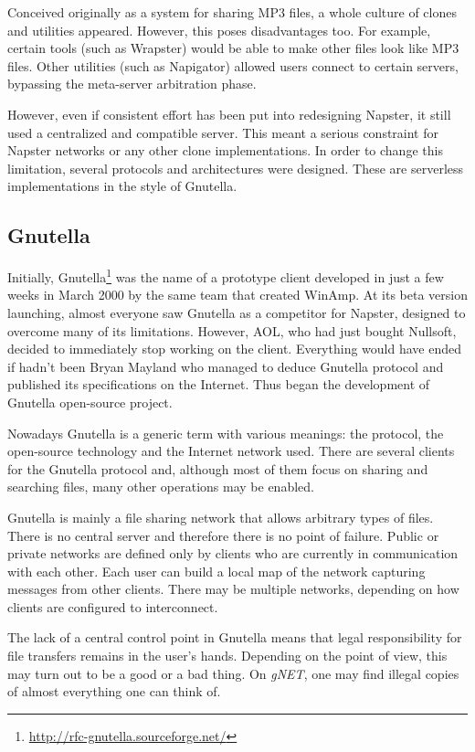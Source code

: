 Conceived originally as a system for sharing MP3 files, a whole culture of
clones and utilities appeared. However, this poses disadvantages too. For
example, certain tools (such as Wrapster) would be able to make other files
look like MP3 files. Other utilities (such as Napigator) allowed users
connect to certain servers, bypassing the meta-server arbitration phase.

However, even if consistent effort has been put into redesigning Napster, it
still used a centralized and compatible server. This meant a serious
constraint for Napster networks or any other clone implementations. In order
to change this limitation, several protocols and architectures were designed.
These are serverless implementations in the style of Gnutella.

\subsection{Gnutella}

Initially, Gnutella\footnote{\url{http://rfc-gnutella.sourceforge.net/}} was the name of a prototype client developed in just a few
weeks in March 2000 by the same team that created WinAmp. At its beta version
launching, almost everyone saw Gnutella as a competitor for Napster, designed
to overcome many of its limitations. However, AOL, who had just bought
Nullsoft, decided to immediately stop working on the client. Everything would
have ended if hadn't been Bryan Mayland who managed to deduce Gnutella
protocol and published its specifications on the Internet. Thus began the
development of Gnutella open-source project.

Nowadays Gnutella is a generic term with various meanings: the protocol, the
open-source technology and the Internet network used. There are several
clients for the Gnutella protocol and, although most of them focus on sharing
and searching files, many other operations may be enabled.

Gnutella is mainly a file sharing network that allows arbitrary types of
files. There is no central server and therefore there is no point of failure.
Public or private networks are defined only by clients who are currently in
communication with each other. Each user can build a local map of the network
capturing messages from other clients. There may be multiple networks,
depending on how clients are configured to interconnect.

The lack of a central control point in Gnutella means that legal
responsibility for file transfers remains in the user's hands. Depending on
the point of view, this may turn out to be a good or a bad thing. On
\textit{gNET}, one may find illegal copies of almost everything one can think
of.

